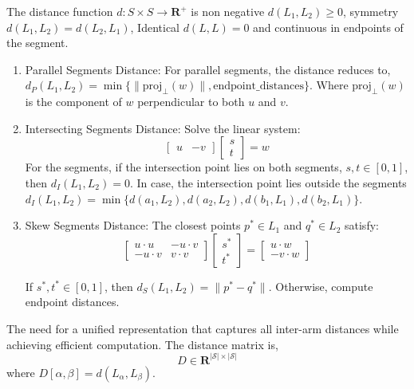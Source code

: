 \documentclass[10pt,twocolumn]{ICCAS}
\begin{document}
The distance function $d: {S\times S} \to \mathbf{R^{+}}$ is non negative $d(L_1, L_2)\geq0$, symmetry $d(L_1, L_2) = d(L_2, L_1)$, Identical $d(L, L) = 0$ and continuous in endpoints of the segment.
\begin{enumerate}[label=\roman*), leftmargin=*, align=left]
    \item Parallel Segments Distance: For parallel segments, the distance reduces to, \newline
    $d_P(L_1, L_2) = \min\{\|\text{proj}_{\perp}(w)\|, \text{endpoint\_distances}\}$. Where $\text{proj}_{\perp}(w)$ is the component of $w$ perpendicular to both $u$ and $v$.
    \item Intersecting Segments Distance: 
    Solve the linear system:
    \[
    \begin{bmatrix} {u} & -{v} \end{bmatrix} \begin{bmatrix} s \\ t \end{bmatrix} = {w}
    \]
    For the segments, if the intersection point lies on both segments, $s, t \in [0,1]$, then $d_I(L_1, L_2) = 0$. In case, the intersection point lies outside the segments $d_I(L_1, L_2) = \min\{d(a_1, L_2), d(a_2, L_2), d(b_1, L_1), d(b_2, L_1)\}$.
    \item Skew Segments Distance: 
    The closest points ${p}^* \in L_1$ and ${q}^* \in L_2$ satisfy:
    \begin{equation}
    \begin{bmatrix} 
    {u} \cdot {u} & -{u} \cdot {v} \\ 
    -{u} \cdot {v} & {v} \cdot {v} 
    \end{bmatrix} 
    \begin{bmatrix} s^* \\ t^* \end{bmatrix} = 
    \begin{bmatrix} {u} \cdot {w} \\ -{v} \cdot {w} \end{bmatrix}
    \end{equation}

    If $s^*, t^* \in [0,1]$, then $d_S(L_1, L_2) = \|{p}^* - {q}^*\|$. Otherwise, compute endpoint distances.
\end{enumerate}
The need for a unified representation that captures all inter-arm distances while achieving efficient computation. The distance matrix is,
\[
{D} \in \mathbf{R}^{|\mathcal{S}| \times |\mathcal{S}|}
\]
where $D[\alpha, \beta] = d(L_{\alpha}, L_{\beta})$.
\end{document}
